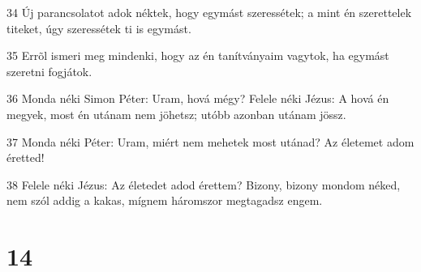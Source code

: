 \par 34 Új parancsolatot adok néktek, hogy egymást szeressétek; a mint én szerettelek titeket, úgy szeressétek ti is egymást.
\par 35 Errõl ismeri meg mindenki, hogy az én tanítványaim vagytok, ha egymást szeretni fogjátok.
\par 36 Monda néki Simon Péter: Uram, hová mégy? Felele néki Jézus: A hová én megyek, most én utánam nem jöhetsz; utóbb azonban utánam jössz.
\par 37 Monda néki Péter: Uram, miért nem mehetek most utánad? Az életemet adom éretted!
\par 38 Felele néki Jézus: Az életedet adod érettem? Bizony, bizony mondom néked, nem szól addig a kakas, mígnem háromszor megtagadsz engem.

\chapter{14}

